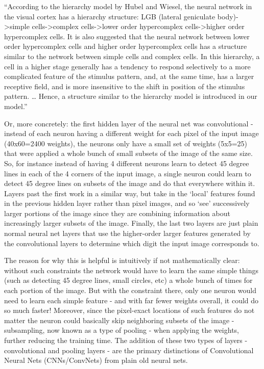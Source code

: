 “According to the hierarchy model by Hubel and Wiesel, the neural network in the visual cortex has a hierarchy structure: LGB (lateral geniculate body)->simple cells->complex cells->lower order hypercomplex cells->higher order hypercomplex cells. It is also suggested that the neural network between lower order hypercomplex cells and higher order hypercomplex cells has a structure similar to the network between simple cells and complex cells. In this hierarchy, a cell in a higher stage generally has a tendency to respond selectively to a more complicated feature of the stimulus pattern, and, at the same time, has a larger receptive field, and is more insensitive to the shift in position of the stimulus pattern. … Hence, a structure similar to the hierarchy model is introduced in our model.”

Or, more concretely: the first hidden layer of the neural net was convolutional - instead of each neuron having a different weight for each pixel of the input image (40x60=2400 weights), the neurons only have a small set of weights (5x5=25) that were applied a whole bunch of small subsets of the image of the same size. So, for instance instead of having 4 different neurons learn to detect 45 degree lines in each of the 4 corners of the input image, a single neuron could learn to detect 45 degree lines on subsets of the image and do that everywhere within it. Layers past the first work in a similar way, but take in the ‘local’ features found in the previous hidden layer rather than pixel images, and so ‘see’ successively larger portions of the image since they are combining information about increasingly larger subsets of the image. Finally, the last two layers are just plain normal neural net layers that use the higher-order larger features generated by the convolutional layers to determine which digit the input image corresponds to.

The reason for why this is helpful is intuitively if not mathematically clear: without such constraints the network would have to learn the same simple things (such as detecting 45 degree lines, small circles, etc) a whole bunch of times for each portion of the image. But with the constraint there, only one neuron would need to learn each simple feature - and with far fewer weights overall, it could do so much faster! Moreover, since the pixel-exact locations of such features do not matter the neuron could basically skip neighboring subsets of the image - subsampling, now known as a type of pooling - when applying the weights, further reducing the training time. The addition of these two types of layers - convolutional and pooling layers - are the primary distinctions of Convolutional Neural Nets (CNNs/ConvNets) from plain old neural nets.


